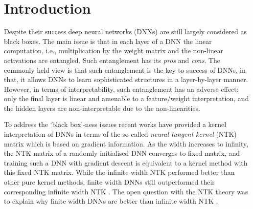 \section{Introduction}\label{sec:intro}
Despite their success deep neural networks (DNNs) are still largely considered as black boxes.  The main issue is that in each layer of a DNN the linear computation, i.e., multiplication by the weight matrix  and the non-linear activations are entangled. Such entanglement has its \emph{pros} and \emph{cons}. The commonly held view  is that such entanglement is the key to success of DNNs, in that, it allows DNNs to learn sophisticated structures in a layer-by-layer manner. However, in terms of interpretability, such entanglement has an adverse effect: only the final layer is linear and amenable to a feature/weight interpretation, and the hidden layers are non-interpretable due to the non-linearities. %

To address the `black box'-ness issues recent works \citep{ntk,arora2019exact,cao2019generalization} have provided a kernel interpretation of DNNs  in terms of the so called \emph{neural tangent kernel} (NTK) matrix which is based on gradient information. As the width increases to infinity, the NTK matrix of a randomly initialised DNN converges to fixed matrix, and training such a DNN with gradient descent is equivalent to a kernel method with this fixed NTK matrix. While the infinite width NTK performed better than other pure kernel methods, finite width DNNs still outperformed their corresponding infinite width NTK \citep{arora2019exact}. The open question with the NTK theory was to explain why finite width DNNs are better than infinite width NTK \citep{arora2019exact}.

